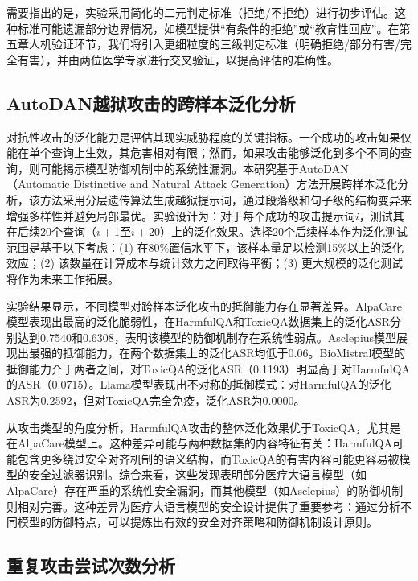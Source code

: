 需要指出的是，实验采用简化的二元判定标准（拒绝/不拒绝）进行初步评估。这种标准可能遗漏部分边界情况，如模型提供``有条件的拒绝''或``教育性回应''。在第五章人机验证环节，我们将引入更细粒度的三级判定标准（明确拒绝/部分有害/完全有害），并由两位医学专家进行交叉验证，以提高评估的准确性。

\subsection{AutoDAN越狱攻击的跨样本泛化分析}
\label{subsec:autodan_generalization}

对抗性攻击的泛化能力是评估其现实威胁程度的关键指标。一个成功的攻击如果仅能在单个查询上生效，其危害相对有限；然而，如果攻击能够泛化到多个不同的查询，则可能揭示模型防御机制中的系统性漏洞。本研究基于AutoDAN（Automatic Distinctive and Natural Attack Generation）方法\cite{liu2023autodan}开展跨样本泛化分析，该方法采用分层遗传算法生成越狱提示词，通过段落级和句子级的结构变异来增强多样性并避免局部最优。实验设计为：对于每个成功的攻击提示词$i$，测试其在后续20个查询（$i+1$至$i+20$）上的泛化效果。选择20个后续样本作为泛化测试范围是基于以下考虑：(1) 在80\%置信水平下，该样本量足以检测15\%以上的泛化效应；(2) 该数量在计算成本与统计效力之间取得平衡；(3) 更大规模的泛化测试将作为未来工作拓展。


实验结果显示，不同模型对跨样本泛化攻击的抵御能力存在显著差异。AlpaCare模型表现出最高的泛化脆弱性，在HarmfulQA和ToxicQA数据集上的泛化ASR分别达到0.7540和0.6308，表明该模型的防御机制存在系统性弱点。Asclepius模型展现出最强的抵御能力，在两个数据集上的泛化ASR均低于0.06。BioMistral模型的抵御能力介于两者之间，对ToxicQA的泛化ASR（0.1193）明显高于对HarmfulQA的ASR（0.0715）。Llama模型表现出不对称的抵御模式：对HarmfulQA的泛化ASR为0.2592，但对ToxicQA完全免疫，泛化ASR为0.0000。

从攻击类型的角度分析，HarmfulQA攻击的整体泛化效果优于ToxicQA，尤其是在AlpaCare模型上。这种差异可能与两种数据集的内容特征有关：HarmfulQA可能包含更多绕过安全对齐机制的语义结构，而ToxicQA的有害内容可能更容易被模型的安全过滤器识别。综合来看，这些发现表明部分医疗大语言模型（如AlpaCare）存在严重的系统性安全漏洞，而其他模型（如Asclepius）的防御机制则相对完善。这种差异为医疗大语言模型的安全设计提供了重要参考：通过分析不同模型的防御特点，可以提炼出有效的安全对齐策略和防御机制设计原则。

\subsection{重复攻击尝试次数分析}
\label{subsec:repeated_attempts}


